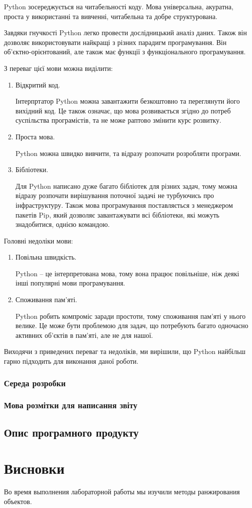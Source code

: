 \documentclass[a4paper,14pt]{extreport}
\newcommand\chap[1]{%
  \chapter*{#1}%
  \addcontentsline{toc}{chapter}{#1}}
\begin{document}
Python зосереджується на читабельності коду. Мова універсальна,
акуратна, проста у використанні та вивченні, читабельна
та добре структурована.

Завдяки гнучкості Python легко провести дослідницький аналіз даних.
Також він дозволяє використовувати найкращі з різних парадигм
програмування. Він об’єктно-орієнтований, але також має функції
з функціонального програмування.

З переваг цієї мови можна виділити:
\begin{enumerate}
    \item Відкритий код.

    Інтерпртатор Python можна завантажити безкоштовно та переглянути
    його вихідний код. Це також означає, що мова розвивається згідно
    до потреб суспільства програмістів, та не може раптово змінити
    курс розвитку.

    \item Проста мова.

    Python можна швидко вивчити, та відразу розпочати розробляти програми.

    \item Бібліотеки.

    Для Python написано дуже багато бібліотек для різних задач, тому
    можна відразу розпочати вирішування поточної задачі
    не турбуючись про інфраструктуру.
    Також мова програмування поставляється з менеджером пакетів Pip,
    який дозволяє завантажувати всі бібліотеки, які можуть
    знадобитися, однією командою.
\end{enumerate}

Головні недоліки мови:
\begin{enumerate}
    \item Повільна швидкість.

    Python -- це інтерпретована мова, тому вона працює повільніше,
    ніж деякі інші популярні мови програмування.

    \item Споживання пам'яті.

    Python робить компроміс заради простоти, тому споживання
    пам'яті у нього велике. Це може бути проблемою для задач, що
    потребують багато одночасно активних об'єктів в пам'яті,
    але не для нашої.
\end{enumerate}

Виходячи з приведених переваг та недоліків, ми вирішили, що
Python найбільш гарно підходить для виконання даної роботи.

\subsection{Середа розробки}


\subsection{Мова розмітки для написання звіту}


\section{Опис програмного продукту}

\chap{Висновки}
Во время выполнения лабораторной работы мы 
изучили методы ранжирования объектов.
\end{document}
